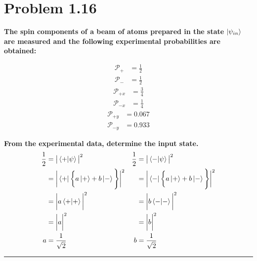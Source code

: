\documentclass[paper=a4, fontsize=11pt]{scrartcl} %
\numberwithin{equation}{section} %
\numberwithin{figure}{section} %
\numberwithin{table}{section} %
\newcommand{\horrule}[1]{\rule{\linewidth}{#1}} %
\begin{document}
\section*{Problem 1.16}
\textbf{The spin components of a beam of atoms prepared in the state} $\ket{\psi_{in}}$ \textbf{are measured and the following
experimental probabilities are obtained:}
\begin{multicols}{3}
\noindent
\begin{align*}
\mathscr{P}_+ & = \tfrac{1}{2} \\
\mathscr{P}_- & = \tfrac{1}{2}
\end{align*}
\begin{align*}
\mathscr{P}_{+x} & = \tfrac{3}{4} \\
\mathscr{P}_{-x} & = \tfrac{1}{4}
\end{align*}
\begin{align*}
\mathscr{P}_{+y} & = 0.067 \\
\mathscr{P}_{-y} & = 0.933
\end{align*}
\end{multicols}
\textbf{From the experimental data, determine the input state.}
\begin{align*}
\frac{1}{2} & = \big | \braket{+|\psi} \big |^2  &  \frac{1}{2} & = \big | \braket{-|\psi} \big |^2                                    \\
& = \bigg | \bra{+} \bigg \{ a\ket{+} + b\ket{-} \Bigg \} \bigg|^2 &    & = \bigg | \bra{-} \bigg \{ a\ket{+} + b\ket{-} \Bigg \} \bigg|^2                   \\
& = \bigg | a \braket{+|+} \bigg|^2         &        & = \bigg | b \braket{-|-} \bigg|^2                                      \\
& = \bigg | a \bigg |^2       &         & = \bigg | b \bigg |^2                                                    \\
a & = \frac{1}{\sqrt{2}}  &   b & = \frac{1}{\sqrt{2}}
\end{align*}
\horrule{2pt}
\end{document}
